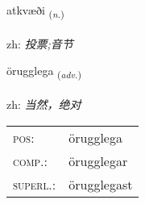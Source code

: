 \documentclass[frontgrid, backgrid]{flacards}\usepackage[]{graphicx}\usepackage[]{color}
\begin{document}
\renewcommand{\flhead}{\vskip5pt \fboxsep=0pt {\small\bfseries\footnotesize Nafnorð | 名词}}
\renewcommand{\fcfoot}{\vskip5pt \fboxsep=0pt \hspace{2pt}{\small\bfseries\footnotesize 2K}}

\renewcommand{\blhead}{\vskip5pt {\small\bfseries\footnotesize Nafnorð | 名词 }}
\renewcommand{\bcfoot}{\vskip5pt \hspace{2pt}{\small\bfseries\footnotesize 2K}}


{atkvæði \small{\textsubscript{(\textit{n.})}} \\[1ex] %
\textphonetic{[aːtkʰvaiðɪ]} \\
zh: \emph{投票;音节} \\  [2ex]
\renewcommand*{\arraystretch}{0.8}
}

\renewcommand{\flhead}{\vskip5pt \fboxsep=0pt {\small\bfseries\footnotesize Atviksorð | 副词}}
\renewcommand{\fcfoot}{\vskip5pt \fboxsep=0pt \hspace{2pt}{\small\bfseries\footnotesize 2K}}

\renewcommand{\blhead}{\vskip5pt {\small\bfseries\footnotesize Atviksorð | 副词 }}
\renewcommand{\bcfoot}{\vskip5pt \hspace{2pt}{\small\bfseries\footnotesize 2K}}


{örugglega \small{\textsubscript{(\textit{adv.})}} \\[1ex] %
\textphonetic{[œːrʏklɛɣa]} \\
zh: \emph{当然，绝对} \\  [2ex]
\renewcommand*{\arraystretch}{0.8}
\begin{tabular}{ll}
\textsc{pos}: & örugglega \\ 
\textsc{comp.}: & örugglegar \\ 
\textsc{superl.}: & örugglegast \\
\end{tabular}
}
\end{document}
